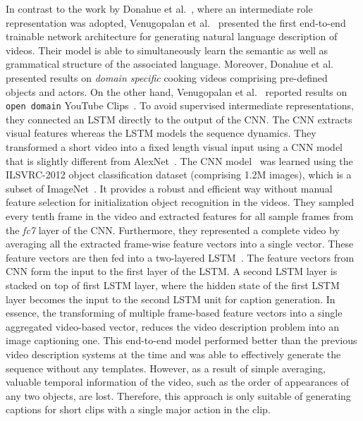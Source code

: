 \documentclass[10pt,journal,compsoc]{IEEEtran}
\begin{document}
In contrast to the work by Donahue et al.~\cite{donahue2015long}, where an intermediate role representation was adopted, Venugopalan et al.~\cite{venugopalan2014translating} presented the first end-to-end trainable network architecture for generating natural language description of videos. Their model is able to simultaneously learn the semantic as well as grammatical structure of the associated language. Moreover, Donahue et al.~\cite{donahue2015long} presented results on {\it domain specific} cooking videos comprising pre-defined objects and actors.  On the other hand, Venugopalan et al.~\cite{venugopalan2014translating} reported results on {\tt open domain} YouTube Clips~\cite{chen2011collecting}. To avoid supervised intermediate representations, they connected an LSTM directly to the output of the CNN. The CNN extracts visual features whereas the LSTM models the sequence dynamics. They transformed a short video into a fixed length visual input using a CNN model~\cite{ jia2014caffe} that is slightly different from AlexNet~\cite{krizhevsky2012imagenet}. The CNN model~\cite{ jia2014caffe} was learned using the ILSVRC-2012 object classification dataset (comprising 1.2M images), which is a subset of ImageNet~\cite{russakovsky2015imagenet}. It provides a robust and efficient way without manual feature selection for initialization object recognition in the videos. They sampled every tenth frame in the video and extracted features for all sample frames from the \textit{fc7} layer of the CNN. Furthermore, they represented a complete video by averaging all the extracted frame-wise feature vectors into a single vector. These feature vectors are then fed into a two-layered LSTM~\cite{graves2013speech}. The feature vectors from CNN form the input to the first layer of the LSTM. A second LSTM layer is stacked on top of first LSTM layer, where the hidden state of the first LSTM layer becomes the input to the second LSTM unit for caption generation. In essence, the transforming of multiple frame-based feature vectors into a single aggregated video-based vector, reduces the video description problem into an image captioning one. This end-to-end model performed better than the previous video description systems at the time and was able to effectively generate the sequence without any templates. However, as a result of simple averaging, valuable temporal information of the video, such as the order of appearances of any two objects, are lost. Therefore, this approach is only suitable of generating captions for short clips with a single major action in the clip.
\end{document}

